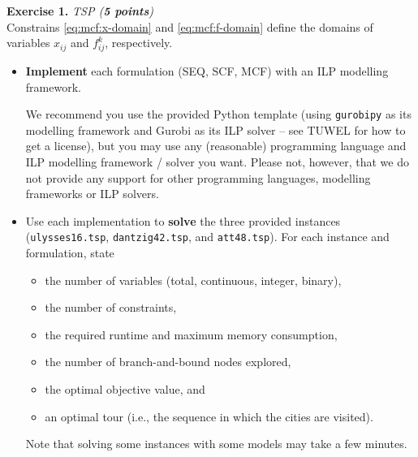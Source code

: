 \documentclass[a4paper]{scrartcl}
\newcounter{exc}
\newenvironment{exercise}[1]%
{\refstepcounter{exc}\textbf{Exercise 1.\arabic{exc}} \emph{#1}\\}
{

\hrulefill\medskip}%
\theoremstyle{definition}
\begin{document}
\begin{exercise}{TSP (\textbf{5 points})}
	Constrains \eqref{eq:mcf:x-domain} and \eqref{eq:mcf:f-domain} define the domains of variables $x_{ij}$ and $f_{ij}^k$, respectively.
	
	
	\bigskip
	\begin{itemize}
		\item \textbf{Implement} each formulation (SEQ, SCF, MCF) with an ILP modelling framework.
		
		We recommend you use the provided Python template (using \texttt{gurobipy} as its modelling framework and Gurobi as its ILP solver -- see TUWEL for how to get a license), but you may use any (reasonable) programming language and ILP modelling framework / solver you want.
		Please not, however, that we do not provide any support for other programming languages, modelling frameworks or ILP solvers.
		
		\item Use each implementation to \textbf{solve} the three provided instances
		(\texttt{ulysses16.tsp}, \texttt{dantzig42.tsp}, and \texttt{att48.tsp}).
		For each instance and formulation, state
		\begin{itemize}
			\item the number of variables (total, continuous, integer, binary),
			\item the number of constraints,
			\item the required runtime and maximum memory consumption,
			\item the number of branch-and-bound nodes explored,
			\item the optimal objective value, and
			\item an optimal tour (i.e., the sequence in which the cities are visited).
		\end{itemize}
		
		Note that solving some instances with some models may take a few minutes.
	\end{itemize}
\end{exercise}
\end{document}
